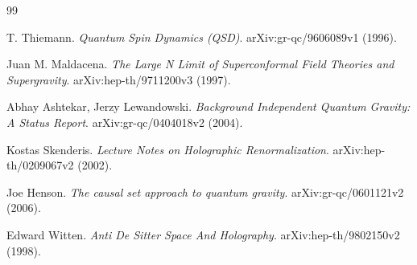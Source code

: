 \documentclass[11pt,a4paper]{article}
\begin{document}
\begin{thebibliography}{99}

T. Thiemann.
\textit{Quantum Spin Dynamics (QSD)}.
arXiv:gr-qc/9606089v1 (1996).

Juan M. Maldacena.
\textit{The Large N Limit of Superconformal Field Theories and Supergravity}.
arXiv:hep-th/9711200v3 (1997).

Abhay Ashtekar, Jerzy Lewandowski.
\textit{Background Independent Quantum Gravity: A Status Report}.
arXiv:gr-qc/0404018v2 (2004).

Kostas Skenderis.
\textit{Lecture Notes on Holographic Renormalization}.
arXiv:hep-th/0209067v2 (2002).

Joe Henson.
\textit{The causal set approach to quantum gravity}.
arXiv:gr-qc/0601121v2 (2006).

Edward Witten.
\textit{Anti De Sitter Space And Holography}.
arXiv:hep-th/9802150v2 (1998).

\end{thebibliography}
\end{document}
